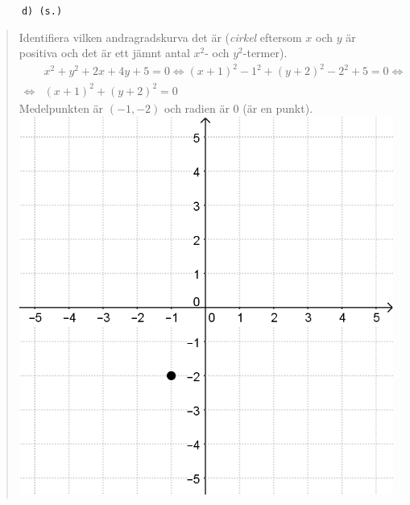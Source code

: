 \documentclass[a4paper]{article}
\newcommand{\tskcol}[1]{\textcolor{tskcol}{#1}}
\begin{document}
	\texttt{\tskcol{~~~~~~d) (s.)}}
	\begin{quotation}
		\noindent
		Identifiera vilken andragradskurva det är (\emph{cirkel} eftersom $x$ och $y$ är positiva och det är ett jämnt antal $x^2$- och $y^2$-termer).
		\begin{align*}
		&x^2+y^2+2x+4y+5=0 \Leftrightarrow
		(x+1)^2-1^2+(y+2)^2-2^2+5=0 \Leftrightarrow \\ \Leftrightarrow
		&(x+1)^2+(y+2)^2=0
		\end{align*}
		Medelpunkten är $(-1,-2)$ och radien är $0$ (är en punkt). \\
		\includegraphics[scale=0.2]{images/531d.png}
	\end{quotation}
	
\end{document}

